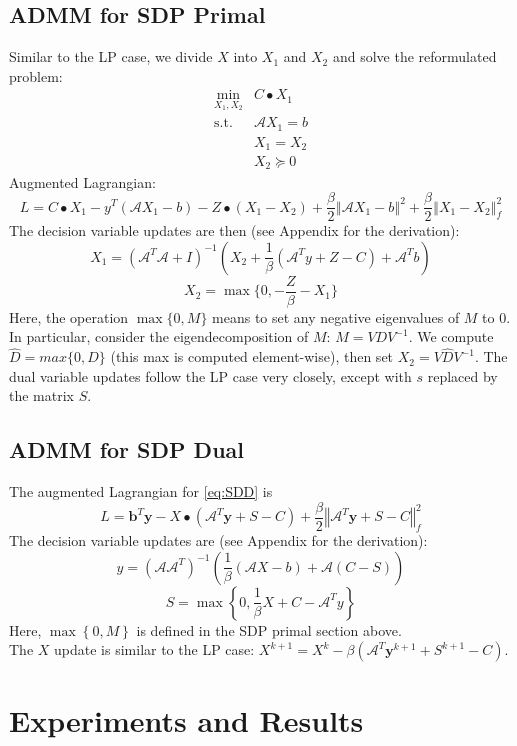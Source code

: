 \documentclass{article}
\begin{document}
\subsection*{ADMM for SDP Primal}
Similar to the LP case, we divide $X$ into $X_{1}$ and $X_{2}$
and solve the reformulated problem:
\begin{eqnarray*} 
\min_{X_{1},X_{2}} & C\bullet X_{1}\\
\text{s.t.} & \mathcal{A}X_{1}=b\\
 & X_{1}=X_{2}\\
 & X_{2}\succeq0
\end{eqnarray*}
Augmented Lagrangian:
\[
L=C\bullet X_{1}-y^{T}\left(\mathcal{A}X_{1}-b\right)-Z\bullet\left(X_{1}-X_{2}\right)+\frac{\beta}{2}\left\Vert \mathcal{A}X_{1}-b\right\Vert ^{2}+\frac{\beta}{2}\left\Vert X_{1}-X_{2}\right\Vert _{f}^{2}
\]
The decision variable updates are then (see Appendix for the derivation):
\[
X_{1}=\left(\mathcal{A}^{T}\mathcal{A}+I\right)^{-1}\left(X_{2}+\frac{1}{\beta}\left(\mathcal{A}^{T}y+Z-C\right)+\mathcal{A}^{T}b\right)
\]
\[
X_{2} = \max\{0,-\frac{Z}{\beta}-X_{1}\}
\]
Here, the operation $\max\{0,M\}$ means to set any negative eigenvalues
of $M$ to 0. In particular, consider the eigendecomposition of $M$:
$M=VDV^{-1}$. We compute $\hat{D}=max\{0,D\}$ (this max is computed
element-wise), then set $X_{2}=V\hat{D}V^{-1}$. The dual variable updates follow the LP case very closely, except with $s$ replaced by the matrix $S$. 

\subsection*{ADMM for SDP Dual}
The augmented Lagrangian for \eqref{eq:SDD} is
\[
L=\mathbf{b}^{T}\mathbf{y}-X\bullet\left(\mathcal{A}^{T}\mathbf{y}+S-C\right)+\frac{\beta}{2}\left\Vert \mathcal{A}^{T}\mathbf{y}+S-C\right\Vert _{f}^{2}
\]
The decision variable updates are (see Appendix for the derivation):
\[
y=\left(\mathcal{A}\mathcal{A}^{T}\right)^{-1}\left(\frac{1}{\beta}\left(\mathcal{A}X-b\right)+\mathcal{A}\left(C-S\right)\right)
\]
\[
S=\max\left\{ 0,\frac{1}{\beta}X+C-\mathcal{A}^{T}y\right\} 
\]
Here, $\max\left\{ 0,M\right\} $ is defined in the SDP primal section above. \\
The $X$ update is similar to the LP case: $X^{k+1}=X^{k}-\beta\left(\mathcal{A}^{T}\mathbf{y}^{k+1}+S^{k+1}-C\right)$.

\section{Experiments and Results}
\end{document}
